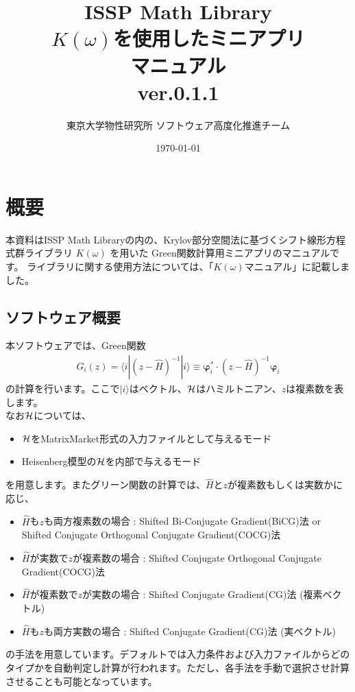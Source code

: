 \documentclass[12pt,titlepage]{jarticle}
\begin{document}
%
%
\title{ISSP Math Library \\
  $K(\omega)$を使用したミニアプリ\\
  マニュアル \\
  ver.0.1.1}
\author{東京大学物性研究所 ソフトウェア高度化推進チーム}
\date{\today}
\maketitle
%

%
%
\tableofcontents

\newpage
\section{概要}

本資料はISSP Math Libraryの内の、Krylov部分空間法に基づくシフト線形方程式群ライブラリ $K(\omega)$ を用いた
Green関数計算用ミニアプリのマニュアルです。
ライブラリに関する使用方法については、「$K(\omega)$マニュアル」に記載しました。

\subsection{ソフトウェア概要}
本ソフトウェアでは、Green関数
\begin{align}
  G_{i}(z) = \langle i | (z-{\hat H})^{-1}| i \rangle \equiv 
  {\boldsymbol \varphi}_i^{*} \cdot (z-{\hat H})^{-1} {\boldsymbol \varphi}_i
\end{align}
の計算を行います。ここで$| i \rangle $はベクトル、${\cal H}$はハミルトニアン、$z$は複素数を表します。\\
なお${\cal H}$については、
\begin{itemize}
\item{${\cal H}$をMatrixMarket形式の入力ファイルとして与えるモード}
\item{Heisenberg模型の${\cal H}$を内部で与えるモード}
\end{itemize}
を用意します。またグリーン関数の計算では、${\hat H}$と$z$が複素数もしくは実数かに応じ、
\begin{itemize}
\item ${\hat H}$も$z$も両方複素数の場合 : Shifted Bi-Conjugate Gradient(BiCG)法 or Shifted Conjugate Orthogonal Conjugate Gradient(COCG)法 
\item ${\hat H}$が実数で$z$が複素数の場合 : Shifted Conjugate Orthogonal Conjugate Gradient(COCG)法 
\item ${\hat H}$が複素数で$z$が実数の場合 : Shifted Conjugate Gradient(CG)法 (複素ベクトル)
\item ${\hat H}$も$z$も両方実数の場合 : Shifted Conjugate Gradient(CG)法 (実ベクトル)
\end{itemize}
の手法を用意しています。デフォルトでは入力条件および入力ファイルからどのタイプかを自動判定し計算が行われます。ただし、各手法を手動で選択させ計算させることも可能となっています。
\end{document}
